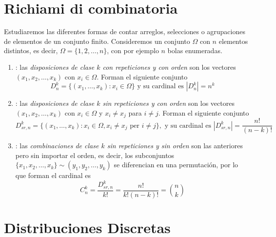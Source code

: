 \section{Richiami di combinatoria}
Estudiaremos las diferentes formas de contar arreglos, selecciones o agrupaciones de elementos de un conjunto finito. Consideremos un conjunto $\Omega$ con $n$ elementos distintos, es decir, $\Omega=\{1,2,\dots,n\}$, con por ejemplo $n$ bolas enumeradas.
\begin{enumerate}[label=\arabic*)]
    \item {}: las \textit{disposiciones de clase $k$ con repeticiones y con orden} son los vectores $(x_1,x_2,\dots,x_k)$ con $x_i \in \Omega$. Forman el siguiente conjunto 
    \begin{equation*}
        D_n^k=\{(x_1, \dots, x_k): x_i \in \Omega\} \text{ y su cardinal es } |D_n^k|=n^k
    \end{equation*}
    
    \item {}: las \textit{disposiciones de clase $k$ sin repeticiones y con orden} son los vectores $(x_1,x_2,\dots,x_k)$ con $x_i \in \Omega$ y $x_i \neq x_j$ para $i\neq j$. Forman el siguiente conjunto
    \begin{equation*}
        D_{sr,n}^k=\{(x_1, \dots, x_k): x_i \in \Omega, x_i \neq x_j \text{ per } i\neq j\}, \text{ y su cardinal es } |D_{sr,n}^k|=\dfrac{n!}{(n-k)!}
    \end{equation*} 
    \item {}: las \textit{combinaciones de clase $k$ sin repeticiones y sin orden} son las anteriores pero sin importar el orden, es decir, los subconjuntos $\{x_1,x_2,\dots,x_k\} \sim (y_1,y_2, \dots, y_k)$ se diferencian en una permutación, por lo que forman el cardinal es 
    \begin{equation*}
        C_n^k=\dfrac{D_{sr,n}^k}{k!}=\dfrac{n!}{k!(n-k)!}=\binom{n}{k}
    \end{equation*}
    
\end{enumerate}

\section{Distribuciones Discretas}

